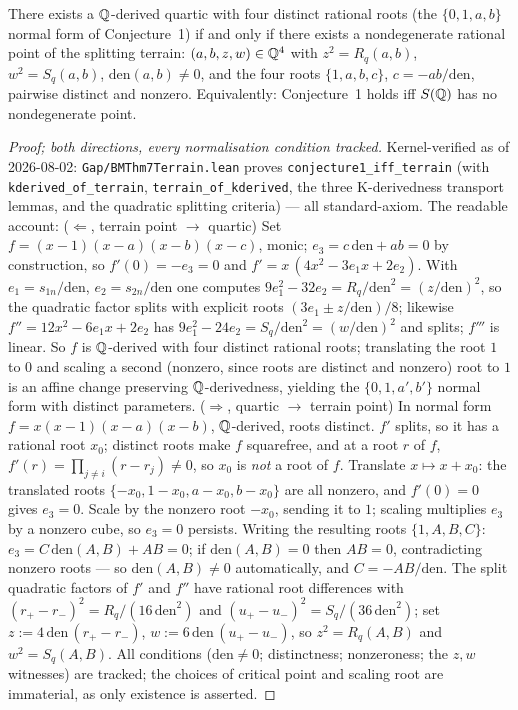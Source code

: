\begin{proposition}\label{prop:normalization_bridge}\leanok
There exists a $\mathbb{Q}$-derived quartic with four distinct rational roots (the
$\{0,1,a,b\}$ normal form of Conjecture~1) if and only if there exists a
nondegenerate rational point of the splitting terrain: $(a,b,z,w)\in\mathbb{Q}^{4}$ with
$z^{2}=R_{q}(a,b)$, $w^{2}=S_{q}(a,b)$, $\mathrm{den}(a,b)\neq0$, and the four
roots $\{1,a,b,c\}$, $c=-ab/\mathrm{den}$, pairwise distinct and nonzero.
Equivalently: Conjecture~1 holds iff $S(\mathbb{Q})$ has no nondegenerate point.
\end{proposition}
\begin{proof}[Proof; both directions, every normalisation condition tracked]\leanok
Kernel-verified as of 2026-08-02: \texttt{Gap/BMThm7Terrain.lean} proves
\texttt{conjecture1\_iff\_terrain} (with \texttt{kderived\_of\_terrain},
\texttt{terrain\_of\_kderived}, the three K-derivedness transport lemmas, and the
quadratic splitting criteria) --- all standard-axiom.  The readable account:
($\Leftarrow$, terrain point $\to$ quartic)  Set
$f=(x-1)(x-a)(x-b)(x-c)$, monic; $e_{3}=c\,\mathrm{den}+ab=0$ by construction, so
$f'(0)=-e_{3}=0$ and $f'=x\,(4x^{2}-3e_{1}x+2e_{2})$.  With
$e_{1}=s_{1n}/\mathrm{den}$, $e_{2}=s_{2n}/\mathrm{den}$ one computes
$9e_{1}^{2}-32e_{2}=R_{q}/\mathrm{den}^{2}=(z/\mathrm{den})^{2}$, so the quadratic
factor splits with explicit roots $(3e_{1}\pm z/\mathrm{den})/8$; likewise
$f''=12x^{2}-6e_{1}x+2e_{2}$ has $9e_{1}^{2}-24e_{2}=S_{q}/\mathrm{den}^{2}
=(w/\mathrm{den})^{2}$ and splits; $f'''$ is linear.  So $f$ is $\mathbb{Q}$-derived with
four distinct rational roots; translating the root $1$ to $0$ and scaling a
second (nonzero, since roots are distinct and nonzero) root to $1$ is an affine
change preserving $\mathbb{Q}$-derivedness, yielding the $\{0,1,a',b'\}$ normal form with
distinct parameters.
($\Rightarrow$, quartic $\to$ terrain point)  In normal form
$f=x(x-1)(x-a)(x-b)$, $\mathbb{Q}$-derived, roots distinct.  $f'$ splits, so it has a
rational root $x_{0}$; distinct roots make $f$ squarefree, and at a root $r$ of
$f$, $f'(r)=\prod_{j\ne i}(r-r_{j})\neq0$, so $x_{0}$ is \emph{not} a root of
$f$.  Translate $x\mapsto x+x_{0}$: the translated roots
$\{-x_{0},1-x_{0},a-x_{0},b-x_{0}\}$ are all nonzero, and $f'(0)=0$ gives
$e_{3}=0$.  Scale by the nonzero root $-x_{0}$, sending it to $1$; scaling
multiplies $e_{3}$ by a nonzero cube, so $e_{3}=0$ persists.  Writing the
resulting roots $\{1,A,B,C\}$: $e_{3}=C\,\mathrm{den}(A,B)+AB=0$; if
$\mathrm{den}(A,B)=0$ then $AB=0$, contradicting nonzero roots --- so
$\mathrm{den}(A,B)\neq0$ automatically, and $C=-AB/\mathrm{den}$.  The split
quadratic factors of $f'$ and $f''$ have rational root differences with
$(r_{+}-r_{-})^{2}=R_{q}/(16\,\mathrm{den}^{2})$ and
$(u_{+}-u_{-})^{2}=S_{q}/(36\,\mathrm{den}^{2})$; set
$z:=4\,\mathrm{den}\,(r_{+}-r_{-})$, $w:=6\,\mathrm{den}\,(u_{+}-u_{-})$, so
$z^{2}=R_{q}(A,B)$ and $w^{2}=S_{q}(A,B)$.  All conditions ($\mathrm{den}\neq0$;
distinctness; nonzeroness; the $z,w$ witnesses) are tracked; the choices of
critical point and scaling root are immaterial, as only existence is asserted.
\end{proof}


